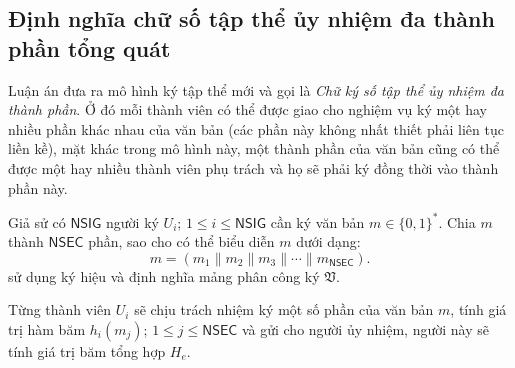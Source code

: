 \subsection{Định nghĩa chữ số tập thể ủy nhiệm đa thành phần tổng quát} \label{dnghiaTTUyNhiem}


Luận án đưa ra mô hình ký tập thể mới và gọi là \textit{Chữ ký số tập thể ủy nhiệm đa thành phần}. Ở đó mỗi thành viên có thể được giao cho nghiệm vụ ký một hay nhiều phần khác nhau của văn bản (các phần này không nhất thiết phải liên tục liền kề), mặt khác trong mô hình này, một thành phần của văn bản cũng có thể được một hay nhiều thành viên phụ trách và họ sẽ phải ký đồng thời vào thành phần này.

Giả sử có ${\mathsf{NSIG}}$ người ký $U_i$; $1\leqslant i\leqslant {\mathsf{NSIG}}$ cần ký văn bản $m \in  \{0,1\}^*$. Chia $m$ thành $\mathsf{NSEC}$ phần, sao cho có thể biểu diễn $m$ dưới dạng: \[ m= (m_1\parallel m_2\parallel m_3 \parallel \dotsm \parallel m_\mathsf{NSEC} ). \] sử dụng ký hiệu và định nghĩa mảng phân công ký $\mathfrak{V}$.

Từng thành viên $U_i$ sẽ chịu trách nhiệm ký một số phần của văn bản $m$, tính giá trị hàm băm $h_i(m_j)$; $1\leqslant j\leqslant \mathsf{NSEC}$ và gửi cho người ủy nhiệm, người này sẽ tính giá trị băm tổng hợp $H_e$. 

